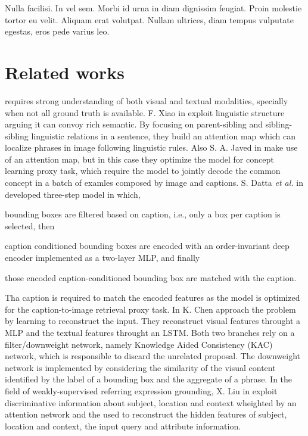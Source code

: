 \begin{savequote}[75mm]
Nulla facilisi. In vel sem. Morbi id urna in diam dignissim feugiat. Proin molestie tortor eu velit. Aliquam erat volutpat. Nullam ultrices, diam tempus vulputate egestas, eros pede varius leo.
\end{savequote}

\chapter{Related works}

 requires strong
understanding of both visual and textual modalities, specially when
not all ground truth is available. F. Xiao \etal{} in  exploit linguistic structure arguing it can convoy rich
semantic. By focusing on parent-sibling and sibling-sibling linguistic
relations in a sentence, they build an attention map which can
localize phrases in image following linguistic rules. Also S. A. Javed
\etal{} in  make use of an attention map, but in this
case they optimize the model for concept learning proxy task, which
require the model to jointly decode the common concept in a batch of
examles composed by image and captions. S. Datta \textit{et al.} in
 developed three-step model in which, 
\begin{enumerate*}[label=(\roman*)] 
    \item bounding boxes are filtered based on caption, i.e., only a
    box per caption is selected, then
    \item caption conditioned bounding boxes are encoded with an
    order-invariant deep encoder implemented as a two-layer MLP, and
    finally
    \item those encoded caption-conditioned bounding box are matched
with the caption.
\end{enumerate*}
Tha caption is required to match the encoded features as the model is
optimized for the caption-to-image retrieval proxy task. In  K.
Chen \etal{} approach the problem by learning to reconstruct the
input. They reconstruct visual features throught a MLP and the textual
features throught an LSTM. Both two branches rely on a
filter/downweight network, namely Knowledge Aided Consistency (KAC)
network, which is responsible to discard the unrelated proposal. The
downweight network is implemented by considering the similarity of the
visual content identified by the label of a bounding box and the
aggregate of a phrase. In the field of weakly-supervised referring
expression grounding, X. Liu \etal{} in 
exploit discriminative information about subject, location and context
wheighted by an attention network and the used to reconstruct the
hidden features of subject, location and context, the input query and
attribute information.


